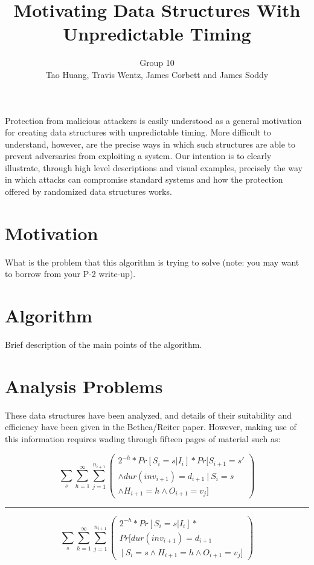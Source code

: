 \documentclass[11pt,twocolumn]{article}
\title{Motivating Data Structures With Unpredictable Timing}
\author{Group 10\\
\small{Tao Huang, Travis Wentz, James Corbett and James Soddy}}
\begin{document}
\maketitle

Protection from malicious attackers is easily understood as a general motivation
for creating data structures with unpredictable timing. More difficult to understand,
however, are the precise ways in which such structures are able to prevent adversaries
from exploiting a system. Our intention is to clearly illustrate, through
high level descriptions and visual examples, precisely the way in which attacks
can compromise standard systems and how the protection offered by randomized
data structures works.

\section{Motivation}
What is the problem that this algorithm is trying to solve (note: you may want 
to borrow from your P-2 write-up).

\section{Algorithm}
Brief description of the main points of the algorithm.

\section{Analysis Problems}
These data structures have been analyzed, and details of their suitability and
efficiency have been given in the Bethea/Reiter paper\cite{Bethea09}. However,
making use of this information requires wading through fifteen pages of material such as:

\begin{minipage}{.5\textwidth}

$$\sum_s\sum_{h=1}^\infty\sum_{j=1}^{n_{i+1}} \left( \begin{matrix}
2^{-h}*Pr[S_i=s | I_i]*Pr[S_{i+1}=s' \\ \land dur(inv_{i+1})=d_{i+1}\  
|\  S_i=s \\ \land H_{i+1}=h \land O_{i+1}=v_j] \end{matrix} \right)$$
\hrule
$$\sum_s\sum_{h=1}^\infty\sum_{j=1}^{n_{i+1}} 
\left( \begin{matrix}2^{-h}*Pr[S_i=s | I_i]*
\\Pr[ dur(inv_{i+1})=d_{i+1} \\ \  | \  S_i=s \land H_{i+1}=h \land O_{i+1}=v_j] \end{matrix} \right)$$

\end{minipage}
\end{document}
